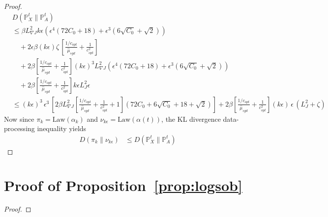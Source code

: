 \documentclass[journal,onecolumn]{IEEEtran}
\newcommand{\alk}{\alpha_k}
\newcommand{\step}{\epsilon}
\newcommand{\grad}{\nabla}
\newcommand{\rew}{J}
\newcommand{\lawXt}{\mathbb{P}_X^t}
\newcommand{\lawAt}{\mathbb{P}_A^t}
\newcommand{\KL}{D}
\newcommand{\dtlaw}{\ids_{k}} %
\newcommand{\ctlaw}{\nu_{k\step}}
\newcommand{\law}{\textrm{Law}}
\newcommand{\ids}{\pi}
\newcommand{\idw}{\gamma}
\newcommand{\ksp}{k,\idw}
\newcommand{\gradnvar}{\zeta}
\newcommand{\lipJ}{L_J}
\newcommand{\lipGJ}{L_{\grad\rew}}
\newcommand{\sgdtm}{c_{opt}}
\begin{document}
{\begin{proof}
{\begin{align*}
        &\KL(\lawXt \| \lawAt) \\& \leq \beta \lipGJ^2 k\step \left(\step^4\left(72C_0+ 18\right) + \step^3\left(6\sqrt{C_0} +\sqrt{2}\right)\right) 
        \\&\quad + 2\step \beta (k\step) \gradnvar\,\left[\frac{1/\sgdtm}{\hat{\mu}_{sgd}} + \frac{1}{\sgdtm^2} \right]
        \\&\quad+ 2\beta \left[\frac{1/\sgdtm}{\hat{\mu}_{sgd}} + \frac{1}{\sgdtm^2} \right](k\step)^3 \lipGJ^2 \left(\step^4\left(72C_0+ 18\right) + \step^3\left(6\sqrt{C_0} +\sqrt{2}\right)\right)\\
        &\quad +  2\beta\left[\frac{1/\sgdtm}{\hat{\mu}_{sgd}} + \frac{1}{\sgdtm^2} \right] k\step\lipJ^2\step \\
        & \leq (k\step)^3\,\step^3\,\left[2\beta \lipGJ^2\left[\frac{1/\sgdtm}{\hat{\mu}_{sgd}} + \frac{1}{\sgdtm^2} +1\right]\left(72C_0 + 6\sqrt{C_0} + 18+\sqrt{2} \right) \right] + 2\beta \left[\frac{1/\sgdtm}{\hat{\mu}_{sgd}} + \frac{1}{\sgdtm^2} \right](k\step)\,\step\,(\lipJ^2 + \gradnvar)
\end{align*}}
Now since $\dtlaw = \law(\alk)$ and $\ctlaw = \law(\alpha(t))$, the KL divergence data-processing inequality yields
\begin{align*}
\KL(\dtlaw \| \ctlaw) & \leq \KL(\lawXt \| \lawAt)
\end{align*}
\end{proof}

\section{Proof of Proposition~\ref{prop:logsob}}
\begin{proof}


\end{proof}}
\end{document}
